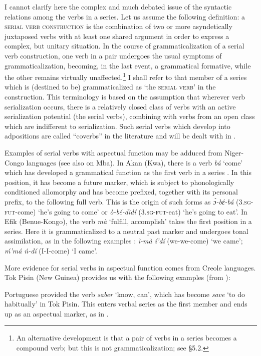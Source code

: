 \label{page37}I cannot clarify here the complex and much debated issue of the syntactic relations among the verbs in a series. Let us assume the following definition: a \textsc{serial verb construction} is the combination of two or more asyndetically juxtaposed verbs with at least one shared argument in order to express a complex, but unitary situation. In the course of grammaticalization of a serial verb construction, one verb in a pair undergoes the usual symptoms of grammaticalization, becoming, in the last event, a grammatical formative, while the other remains virtually unaffected.\footnote{An alternative development is that a pair of verbs in a series becomes a compound verb; but this is not grammaticalization; see §5.2.} I shall refer to that member of a series which is (destined to be) grammaticalized as ‘the \textsc{serial verb}’ in the construction. This terminology is based on the assumption that wherever verb serialization occurs, there is a relatively closed class of verbs with an active serialization potential (the serial verbs), combining with verbs from an open class which are indifferent to serialization. Such serial verbs which develop into adpositions are called ``coverbs'' in the literature and will be dealt with in .

Examples of serial verbs with aspectual function may be adduced from Niger-Congo languages (see also \citealt[113--117]{Sasse1977a} on Mba). In Akan (Kwa), there is a verb \textit{bá} ‘come’ which has developed a grammatical function as the first verb in a series \citep[353f]{Welmers1973}. In this position, it has become a future marker, which is subject to phonologically conditioned allomorphy and has become prefixed, together with its personal prefix, to the following full verb. This is the origin of such forms as \textit{\'ɔ-bέ-bá} (3.\textsc{sg-fut}-come) ‘he's going to come’ or \textit{ò-bé-dìdí} (3.\textsc{sg-fut}-eat) ‘he's going to eat’. In Efik (Benue-Kongo), the verb \textit{mà} ‘fulfill, accomplish’ takes the first position in a series. Here it is grammaticalized to a neutral past marker and undergoes tonal assimilation, as in the following examples \citep[371]{Welmers1973}: \textit{ì-mà í'dí} (we-\past we-come) ‘we came’; \textit{\'m'má ń-dí} (I-\past I-come) ‘I came’.

More evidence for serial verbs in aspectual function comes from Creole languages. Tok Pisin (New Guinea) provides us with the following examples (from \citealt{Mosel1980}):

\noindent Portuguese provided the verb \textit{saber} ‘know, can’, which has become \textit{save} ‘to do habitually’ in Tok Pisin. This enters verbal series as the first member and ends up as an aspectual marker, as in .

